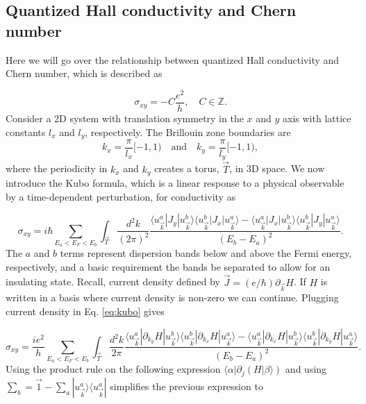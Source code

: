 \subsection{Quantized Hall conductivity and Chern number}

Here we will go over the relationship between quantized Hall conductivity and Chern number, which is described as

\begin{equation}
  \sigma_{xy} = - C\dfrac{e^2}{h}, \quad C \in \mathbb{Z}.
\end{equation}
Consider a 2D system with translation symmetry in the $x$ and $y$ axis with lattice constants $l_x$ and $l_y$, respectively.
The Brillouin zone boundaries are
\begin{equation}
  k_x = \dfrac{\pi}{l_x} [-1,1) \quad \text{and} \quad k_y = \dfrac{\pi}{l_y} [-1,1),
\end{equation}
where the periodicity in $k_x$ and $k_y$ creates a torus, $\vec{T}$, in 3D space.
We now introduce the Kubo formula, which is a linear response to a physical observable by a time-dependent perturbation, for conductivity as

\begin{equation} \label{eq:kubo}
  \sigma_{xy} = i\hbar \sum_{E_a < E_F < E_b} \int_{\vec{T}} \dfrac{d^2k}{(2\pi)^2} \dfrac{\langle u_{\vec{k}}^a | J_y | u_{\vec{k}}^b \rangle \langle u_{\vec{k}}^b | J_x | u_{\vec{k}}^a \rangle - \langle u_{\vec{k}}^a | J_x | u_{\vec{k}}^b \rangle \langle u_{\vec{k}}^b | J_y | u_{\vec{k}}^a \rangle}{{(E_b - E_a)}^2}.
\end{equation}
The $a$ and $b$ terms represent dispersion bands below and above the Fermi energy, respectively, and a basic requirement the bands be separated to allow for an insulating state.
Recall, current density defined by $\vec{J} = (e/\hbar) \partial_{\vec{k}} H$.
If $H$ is written in a basis where current density is non-zero we can continue.
Plugging current density in Eq. \eqref{eq:kubo} gives

\begin{equation}
  \sigma_{xy} = \dfrac{ie^2}{h} \sum_{E_a < E_F < E_b} \int_{\vec{T}} \dfrac{d^2k}{2\pi} \dfrac{\langle u_{\vec{k}}^a | \partial_{k_y} H | u_{\vec{k}}^b \rangle \langle u_{\vec{k}}^b | \partial_{k_x} H | u_{\vec{k}}^a \rangle - \langle u_{\vec{k}}^a | \partial_{k_x} H | u_{\vec{k}}^b \rangle \langle u_{\vec{k}}^b | \partial_{k_y} H | u_{\vec{k}}^a \rangle}{{(E_b - E_a)}^2}.
\end{equation}
Using the product rule on the following expression $\langle \alpha | \partial_j (H | \beta\rangle)$ and using $\sum_b = \vec{1} - \sum_a |u_{\vec{k}}^a\rangle \langle u_{\vec{k}}^a |$ simplifies the previous expression to


